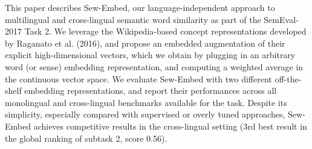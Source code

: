 This paper describes Sew-Embed, our language-independent approach to multilingual and cross-lingual semantic word similarity as part of the SemEval-2017 Task 2. We leverage the Wikipedia-based concept representations developed by Raganato et al. (2016), and propose an embedded augmentation of their explicit high-dimensional vectors, which we obtain by plugging in an arbitrary word (or sense) embedding representation, and computing a weighted average in the continuous vector space. We evaluate Sew-Embed with two different off-the-shelf embedding representations, and report their performances across all monolingual and cross-lingual benchmarks available for the task. Despite its simplicity, especially compared with supervised or overly tuned approaches, Sew-Embed achieves competitive results in the cross-lingual setting (3rd best result in the global ranking of subtask 2, score 0.56).
